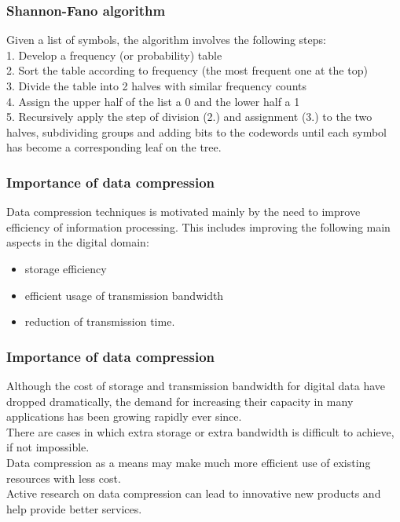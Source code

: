 \begin{frame}
\frametitle{Shannon-Fano algorithm}
Given a list of symbols, the algorithm involves the following steps:\\
1. Develop a frequency (or probability) table\\
2. Sort the table according to frequency (the most frequent one at the top)\\
3. Divide the table into 2 halves with similar frequency counts\\
4. Assign the upper half of the list a 0 and the lower half a 1\\
5. Recursively apply the step of division (2.) and assignment (3.) to the
two halves, subdividing groups and adding bits to the codewords until
each symbol has become a corresponding leaf on the tree.
\end{frame}
\begin{frame}
\frametitle{Importance of data compression}
Data compression techniques is motivated mainly by the need to improve
efficiency of information processing. This includes improving the following
main aspects in the digital domain:
\begin{itemize} \item storage efficiency
\item  efficient usage of transmission bandwidth
\item reduction of transmission time. \end{itemize}
\end{frame}
\begin{frame}
\frametitle{Importance of data compression}
Although the cost of storage and transmission bandwidth for digital data
have dropped dramatically, the demand for increasing their capacity in many
applications has been growing rapidly ever since.\\ There are cases in which
extra storage or extra bandwidth is difficult to achieve, if not impossible.\\
Data compression as a means may make much more efficient use of existing
resources with less cost. \\ Active research on data compression can lead to
innovative new products and help provide better services.
\end{frame}
